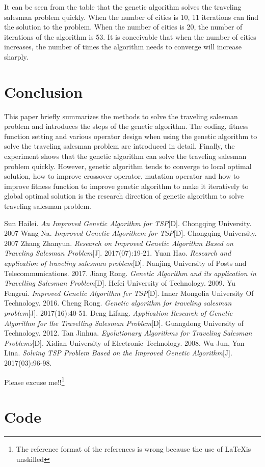 \documentclass[12pt]{article}
\begin{document}
It can be seen from the table that the genetic algorithm solves the traveling salesman problem quickly. When the number of cities is 10, 11 iterations can find the solution to the problem.
When the number of cities is 20, the number of iterations of the algorithm is 53. It is conceivable that when the number of cities increases, the number of times the algorithm needs to converge will increase sharply.

\section{Conclusion}
This paper briefly summarizes the methods to solve the traveling salesman problem and introduces the steps of the genetic algorithm. The coding, fitness function setting and various operator design when using the genetic algorithm to solve the traveling salesman problem are introduced in detail. Finally, the experiment shows that the genetic algorithm can solve the traveling salesman problem quickly. However, genetic algorithm tends to converge to local optimal solution, how to improve crossover operator, mutation operator and how to improve fitness function to improve genetic algorithm to make it iteratively to global optimal solution is the research direction of genetic algorithm to solve traveling salesman problem.
\newpage
\begin{thebibliography}{99}
    Sun Hailei. \emph{An Improved Genetic Algorithm for TSP}[D]. Chongqing University. 2007
    Wang Na. \emph{Improved Genetic Algorithem for TSP}[D]. Chongqing University. 2007
    Zhang Zhanyun. \emph{Research on Improved Genetic Algorithm Based on Traveling Salesman Problem}[J]. 2017(07):19-21.
    Yuan Hao. \emph{Research and application of traveling salesman problem}[D]. Nanjing University of Posts and Telecommunications. 2017.
    Jiang Rong. \emph{Genetic Algorithm and its application in Travelling Salesman Problem}[D]. Hefei University of Technology. 2009.
    Yu Fengrui. \emph{Improved Genetic Algorithm fer TSP}[D]. Inner Mongolia University Of Technology. 2016.
    Cheng Rong. \emph{Genetic algorithm for traveling salesman problem}[J]. 2017(16):40-51.
    Deng Lifang. \emph{Application Research of Genetic Algorithm for the Travelling Salesman Problem}[D]. Guangdong University of Technology. 2012.
    Tan Jinhua. \emph{Eyolutionary Algorithms for Traveling Salesman Problems}[D]. Xidian University of Electronic Technology. 2008.
    Wu Jun, Yan Lina. \emph{Solving TSP Problem Based on the Improved Genetic Algorithm}[J]. 2017(03):96-98.
\end{thebibliography}
\vspace{3.4cm}
Please excuse me!!\footnote{The reference format of the references is wrong because the use of \LaTeX is unskilled}
\newpage
\appendix
\section{Code}

\end{document}
